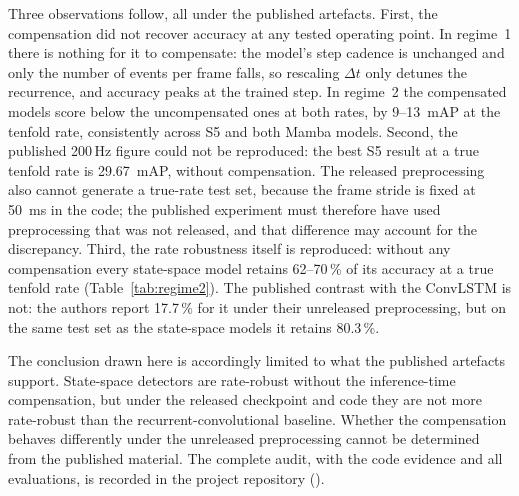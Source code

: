 \documentclass[11pt, a4paper]{report}
\begin{document}
Three observations follow, all under the published artefacts. First, the compensation did not recover
accuracy at any tested operating point. In regime~1 there is nothing for it to compensate: the model's
step cadence is unchanged and only the number of events per frame falls, so rescaling $\Delta t$ only
detunes the recurrence, and accuracy peaks at the trained step. In regime~2 the compensated models score
below the uncompensated ones at both rates, by 9--13~mAP at the tenfold rate, consistently across S5 and
both Mamba models. Second, the published 200\,Hz figure could not be reproduced: the best S5 result at a
true tenfold rate is 29.67~mAP, without compensation. The released preprocessing also cannot generate a
true-rate test set, because the frame stride is fixed at 50~ms in the code; the published experiment
must therefore have used preprocessing that was not released, and that difference may account for the
discrepancy. Third, the rate robustness itself is reproduced: without any compensation every state-space
model retains 62--70\,\% of its accuracy at a true tenfold rate (Table~\ref{tab:regime2}). The published
contrast with the ConvLSTM is not: the authors report 17.7\,\% for it under their unreleased
preprocessing, but on the same test set as the state-space models it retains 80.3\,\%.

The conclusion drawn here is accordingly limited to what the published artefacts support. State-space
detectors are rate-robust without the inference-time compensation, but under the released checkpoint and
code they are not more rate-robust than the recurrent-convolutional baseline. Whether
the compensation behaves differently under the unreleased preprocessing cannot be determined from the
published material. The complete audit, with the code evidence and all evaluations, is recorded in the
project repository ().
\end{document}
